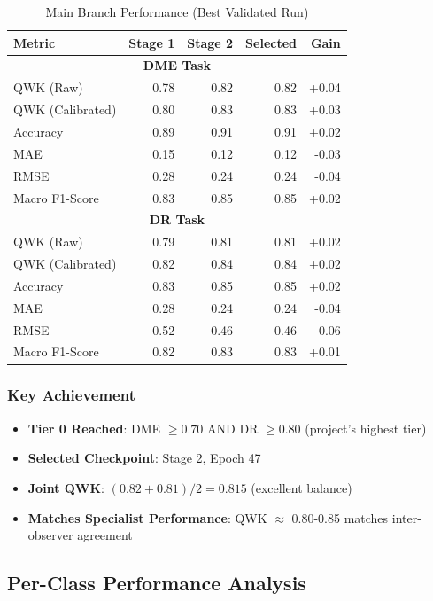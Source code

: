 \documentclass[12pt,a4paper]{article}
\begin{document}
\begin{table}[H]
\centering
\small
\caption{Main Branch Performance (Best Validated Run)}
\begin{tabular}{|l|r|r|r|r|}
\hline
\textbf{Metric} & \textbf{Stage 1} & \textbf{Stage 2} & \textbf{Selected} & \textbf{Gain} \\
\hline
\multicolumn{5}{|c|}{\textbf{DME Task}} \\
\hline
QWK (Raw) & 0.78 & 0.82 & 0.82 & +0.04 \\
QWK (Calibrated) & 0.80 & 0.83 & 0.83 & +0.03 \\
Accuracy & 0.89 & 0.91 & 0.91 & +0.02 \\
MAE & 0.15 & 0.12 & 0.12 & -0.03 \\
RMSE & 0.28 & 0.24 & 0.24 & -0.04 \\
Macro F1-Score & 0.83 & 0.85 & 0.85 & +0.02 \\
\hline
\multicolumn{5}{|c|}{\textbf{DR Task}} \\
\hline
QWK (Raw) & 0.79 & 0.81 & 0.81 & +0.02 \\
QWK (Calibrated) & 0.82 & 0.84 & 0.84 & +0.02 \\
Accuracy & 0.83 & 0.85 & 0.85 & +0.02 \\
MAE & 0.28 & 0.24 & 0.24 & -0.04 \\
RMSE & 0.52 & 0.46 & 0.46 & -0.06 \\
Macro F1-Score & 0.82 & 0.83 & 0.83 & +0.01 \\
\hline
\end{tabular}
\end{table}

\subsubsection{Key Achievement}

\begin{itemize}
    \item \textbf{Tier 0 Reached}: DME $\geq 0.70$ AND DR $\geq 0.80$ (project's highest tier)
    \item \textbf{Selected Checkpoint}: Stage 2, Epoch 47
    \item \textbf{Joint QWK}: $(0.82 + 0.81) / 2 = 0.815$ (excellent balance)
    \item \textbf{Matches Specialist Performance}: QWK $\approx$ 0.80-0.85 matches inter-observer agreement
\end{itemize}

\subsection{Per-Class Performance Analysis}
\end{document}
